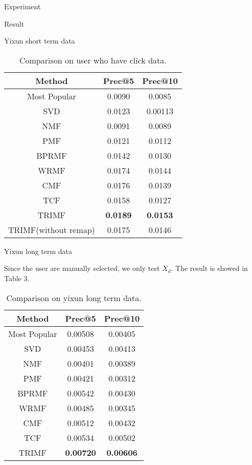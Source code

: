 \begin{section}{Experiment}
\begin{subsection}{Result}
\begin{subsubsection}{Yixun short term data}
\begin{table}
  \centering
  \begin{tabular}{|c|c|c|}
    \hline
    Method&Prec@5&Prec@10\\
    \hline
    Most Popular&0.0090&0.0085\\
    \hline
    SVD&0.0123&0.00113\\
    \hline
    NMF&0.0091&0.0089\\
    \hline
    PMF&0.0121&0.0112\\
    \hline
    BPRMF&0.0142&0.0130\\
    \hline
    WRMF&0.0174&0.0144\\
    \hline
    CMF&0.0176&0.0139\\
    \hline
    TCF&0.0158&0.0127\\
    \hline
    TRIMF&\textbf{\color{red}0.0189}&\textbf{\color{red}0.0153}\\
    \hline
    TRIMF(without remap)&0.0175&0.0146\\
    \hline
  \end{tabular}
  \caption{Comparison on user who have click data.}
\end{table}
\end{subsubsection}


\begin{subsubsection}
  {Yixun long term data}
\par{Since the user are manually selected, we only test $X_d$. The result is showed in Table 3.}

\begin{table}
  \centering
  \begin{tabular}{|c|c|c|}
    \hline
    Method&Prec@5&Prec@10\\
    \hline
    Most Popular&0.00508&0.00405\\
    \hline
    SVD&0.00453&0.00413\\
    \hline
    NMF&0.00401&0.00389\\
    \hline
    PMF&0.00421&0.00312\\
    \hline
    BPRMF&0.00542&0.00430\\
    \hline
    WRMF&0.00485&0.00345\\
    \hline
    CMF&0.00512&0.00432\\
    \hline
    TCF&0.00534&0.00502\\
    \hline
    TRIMF&\textbf{\color{red}0.00720}&\textbf{\color{red}0.00606}\\
    \hline
  \end{tabular}
  \caption{Comparison on yixun long term data.}
\end{table}
\end{subsubsection}

\end{subsection}
\end{section}

